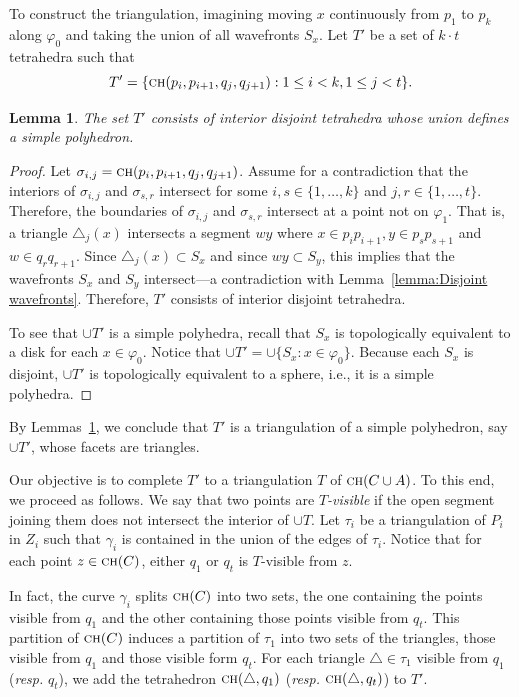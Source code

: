 \documentclass[a4paper, 11pt]{article}
\newtheorem{lemma}[theorem]{Lemma}
\newcommand{\ch}[1]{\ensuremath{\textsc{ch}(#1)}}
\begin{document}
To construct the triangulation, imagining moving $x$ continuously from $p_1$ to $p_k$ along $\varphi_0$ and taking the union of all wavefronts $S_x$. 
Let $T'$  be a set of $k\cdot t$ tetrahedra such that $$T' = \{\ch{p_i, p_{i+1}, q_j, q_{j+1}} : 1\leq i <k, 1\leq j < t\}.$$

\begin{lemma}\label{lemma:Interior disjoint tetrahedra}
The set $T'$ consists of interior disjoint tetrahedra whose union defines a simple polyhedron.
\end{lemma} 
\begin{proof}
Let $\sigma_{i,j} = \ch{p_i, p_{i+1}, q_j, q_{j+1}}$.
Assume for a contradiction that the interiors of $\sigma_{i,j}$ and $\sigma_{s,r}$ intersect for some $i,s \in \{1, \ldots, k\}$ and $j,r\in \{1, \ldots,  t\}$.
Therefore, the boundaries of $\sigma_{i,j}$ and $\sigma_{s,r}$ intersect at a point not on $\varphi_1$.
That is, a triangle $\triangle_j(x)$ intersects a segment $w y$ where $x\in p_ip_{i+1}, y\in p_s p_{s+1}$ and $w\in q_{r}q_{r+1}$.
Since $\triangle_j(x)\subset S_x$ and since $wy\subset S_y$,
this implies that the wavefronts $S_x$ and $S_y$ intersect---a contradiction with Lemma~\ref{lemma:Disjoint wavefronts}.
Therefore, $T'$ consists of interior disjoint tetrahedra.

To see that $\cup T'$ is a simple polyhedra, recall that $S_x$ is topologically equivalent to a disk for each $x\in \varphi_0$.
Notice that $\cup T' = \cup\{S_x : x\in \varphi_0\}$. Because each $S_x$ is disjoint, $\cup T'$ is topologically equivalent to a sphere, i.e., it is a simple polyhedra.
\end{proof}

By Lemmas~\ref{lemma:Interior disjoint tetrahedra}, we conclude that $T'$ is a triangulation of a simple polyhedron, say $\cup T'$, whose facets are triangles.

Our objective is to complete $T'$ to a triangulation $T$ of $\ch{C\cup A}$. To this end, we proceed as follows.
We say that two points are \emph{$T$-visible} if the open segment joining them does not intersect the interior of $\cup T$.
Let $\tau_i$ be a triangulation of $P_i$ in $Z_i$ such that $\gamma_i$ is contained in the union of the edges of $\tau_i$.
Notice that for each point $z\in \ch{C}$, either $q_1$ or $q_t$ is $T$-visible from $z$. 

In fact, the curve $\gamma_i$ splits $\ch{C}$ into two sets, the one containing the points visible from $q_1$ and the other containing those points visible from $q_t$.
This partition of $\ch{C}$ induces a partition of $\tau_1$ into two sets of the triangles, those visible from $q_1$ and those visible form $q_t$.
For each triangle $\triangle\in \tau_1$ visible from $q_1$ (\emph{resp.} $q_t$), we add the tetrahedron $\ch{\triangle, q_1}$ (\emph{resp.} $\ch{\triangle, q_t}$) to $T'$. 
\end{document}
